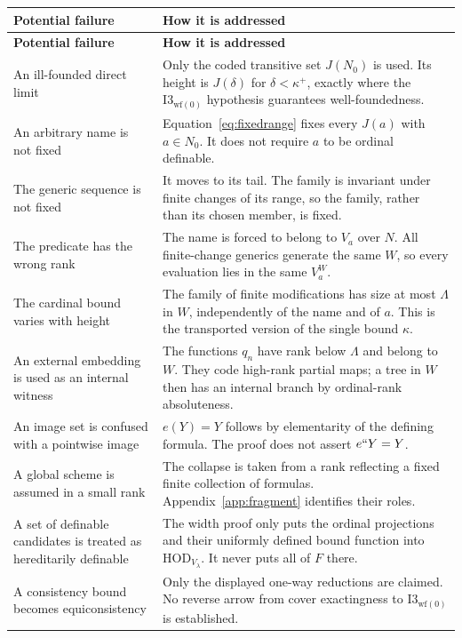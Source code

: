 \documentclass[11pt,letterpaper]{article}
\theoremstyle{definition}
\newcommand{\HOD}{\mathrm{HOD}}
\newcommand{\Iwf}{\mathrm{I3}_{\mathrm{wf}(0)}}
\begin{document}
\begingroup\small
\renewcommand{\arraystretch}{1.17}
\begin{longtable}{@{}P{.27\textwidth}P{.66\textwidth}@{}}
\toprule
\textbf{Potential failure}&\textbf{How it is addressed}\\\midrule\endfirsthead
\toprule\textbf{Potential failure}&\textbf{How it is addressed}\\\midrule\endhead
An ill-founded direct limit&Only the coded transitive set $J(N_0)$ is used. Its height is $J(\delta)$ for $\delta<\kappa^+$, exactly where the $\Iwf$ hypothesis guarantees well-foundedness.\\[4pt]
An arbitrary name is not fixed&Equation~\eqref{eq:fixedrange} fixes every $J(a)$ with $a\in N_0$. It does not require $a$ to be ordinal definable.\\[4pt]
The generic sequence is not fixed&It moves to its tail. The family is invariant under finite changes of its range, so the family, rather than its chosen member, is fixed.\\[4pt]
The predicate has the wrong rank&The name is forced to belong to $V_a$ over $N$. All finite-change generics generate the same $W$, so every evaluation lies in the same $V_a^W$.\\[4pt]
The cardinal bound varies with height&The family of finite modifications has size at most $\Lambda$ in $W$, independently of the name and of $a$. This is the transported version of the single bound $\kappa$.\\[4pt]
An external embedding is used as an internal witness&The functions $q_n$ have rank below $\Lambda$ and belong to $W$. They code high-rank partial maps; a tree in $W$ then has an internal branch by ordinal-rank absoluteness.\\[4pt]
An image set is confused with a pointwise image&$e(Y)=Y$ follows by elementarity of the defining formula. The proof does not assert $e``Y=Y$.\\[4pt]
A global scheme is assumed in a small rank&The collapse is taken from a rank reflecting a fixed finite collection of formulas. Appendix~\ref{app:fragment} identifies their roles.\\[4pt]
A set of definable candidates is treated as hereditarily definable&The width proof only puts the ordinal projections and their uniformly defined bound function into $\HOD_{V_\lambda}$. It never puts all of $F$ there.\\[4pt]
A consistency bound becomes equiconsistency&Only the displayed one-way reductions are claimed. No reverse arrow from cover exactingness to $\Iwf$ is established.\\
\bottomrule
\end{longtable}
\endgroup
\end{document}
